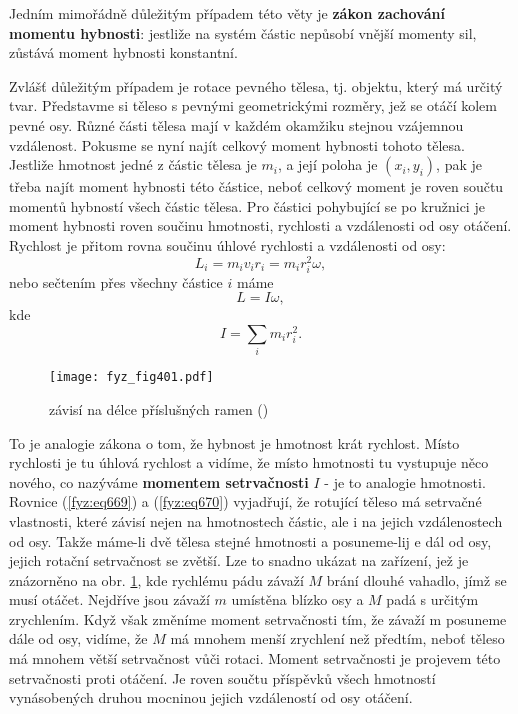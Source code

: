     Jedním mimořádně důležitým případem této věty je \textbf{zákon zachování momentu hybnosti}:
    jestliže na systém částic nepůsobí vnější momenty sil, zůstává moment hybnosti konstantní.

    Zvlášť důležitým případem je rotace pevného tělesa, tj. objektu, který má určitý tvar.
    Představme si těleso s pevnými geometrickými rozměry, jež se otáčí kolem pevné osy. Různé části
    tělesa mají v každém okamžiku stejnou vzájemnou vzdálenost. Pokusme se nyní najít celkový moment
    hybnosti tohoto tělesa. Jestliže hmotnost jedné z částic tělesa je \(m_i\), a její poloha je
    \((x_i, y_i)\), pak je třeba najít moment hybnosti této částice, neboť celkový moment je roven
    součtu momentů hybností všech částic tělesa. Pro částici pohybující se po kružnici je moment
    hybnosti roven součinu hmotnosti, rychlosti a vzdálenosti od osy otáčení. Rychlost je přitom
    rovna součinu úhlové rychlosti a vzdálenosti od osy:
    \begin{equation}\label{fyz:eq668}
      L_i=m_iv_ir_i=m_ir^2_iω,
    \end{equation}
    nebo sečtením přes všechny částice \(i\) máme
    \begin{equation}\label{fyz:eq669}
      L=Iω,
    \end{equation}
    kde 
    \begin{equation}\label{fyz:eq670}
      I=∑_im_ir^2_i.
    \end{equation}   

    \begin{figure}[ht!] %
      \centering
      \texttt{[image: fyz\_fig401.pdf]}
      \caption{ závisí na délce příslušných ramen
              (\cite[s.~10000]{Feynman01})}
      \label{fyz:fig401}
    \end{figure}  

    To je analogie zákona o tom, že hybnost je hmotnost krát rychlost. Místo rychlosti je tu úhlová
    rychlost a vidíme, že místo hmotnosti tu vystupuje něco nového, co nazýváme \textbf{momentem
    setrvačnosti} \(I\) - je to analogie hmotnosti. Rovnice (\ref{fyz:eq669}) a (\ref{fyz:eq670})
    vyjadřují, že rotující těleso má setrvačné vlastnosti, které závisí nejen na hmotnostech částic,
    ale i na jejich vzdálenostech od osy. Takže máme-li dvě tělesa stejné hmotnosti a posuneme-lij e
    dál od osy, jejich rotační setrvačnost se zvětší. Lze to snadno ukázat na zařízení, jež je
    znázorněno na obr. \ref{fyz:fig401}, kde rychlému pádu závaží \(M\) brání dlouhé vahadlo, jímž
    se musí otáčet. Nejdříve jsou závaží \(m\) umístěna blízko osy a \(M\) padá s určitým
    zrychlením. Když však změníme moment setrvačnosti tím, že závaží m posuneme dále od osy, vidíme,
    že \(M\) má mnohem menší zrychlení než předtím, neboť těleso má mnohem větší setrvačnost vůči
    rotaci. Moment setrvačnosti je projevem této setrvačnosti proti otáčení. Je roven součtu
    příspěvků všech hmotností vynásobených druhou mocninou jejich vzdáleností od osy otáčení.

